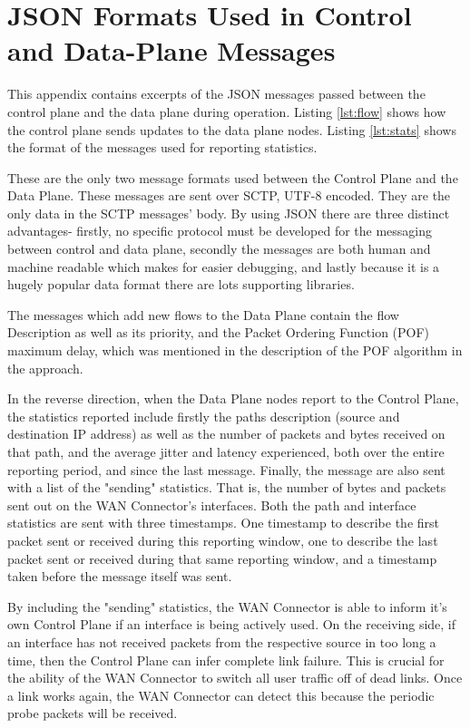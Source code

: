 

\cleardoublepage
\chapter{JSON Formats Used in Control and Data-Plane Messages}
\label{appendix:format}

This appendix contains excerpts of the JSON messages passed between the control plane and the data plane during operation. Listing \ref{lst:flow} shows how the control plane sends updates to the data plane nodes. Listing \ref{lst:stats} shows the format of the messages used for reporting statistics.

These are the only two message formats used between the Control Plane and the Data Plane. These messages are sent over SCTP, UTF-8 encoded. They are the only data in the SCTP messages' body. By using JSON there are three distinct advantages- firstly, no specific protocol must be developed for the messaging between control and data plane, secondly the messages are both human and machine readable which makes for easier debugging, and lastly because it is a hugely popular data format there are lots supporting libraries. 

The messages which add new flows to the Data Plane contain the flow Description as well as its priority, and the Packet Ordering Function (POF) maximum delay, which was mentioned in the description of the POF algorithm in the approach.

In the reverse direction, when the Data Plane nodes report to the Control Plane, the statistics reported include firstly the paths description (source and destination IP address) as well as the number of packets and bytes received on that path, and the average jitter and latency experienced, both over the entire reporting period, and since the last message. Finally, the message are also sent with a list of the "sending" statistics. That is, the number of bytes and packets sent out on the WAN Connector's interfaces. Both the path and interface statistics are sent with three timestamps. One timestamp to describe the first packet sent or received during this reporting window, one to describe the last packet sent or received during that same reporting window, and a timestamp taken before the message itself was sent.

By including the "sending" statistics, the WAN Connector is able to inform it's own Control Plane if an interface is being actively used. On the receiving side, if an interface has not received packets from the respective source in too long a time, then the Control Plane can infer complete link failure. This is crucial for the ability of the WAN Connector to switch all user traffic off of dead links. Once a link works again, the WAN Connector can detect this because the periodic probe packets will be received.

